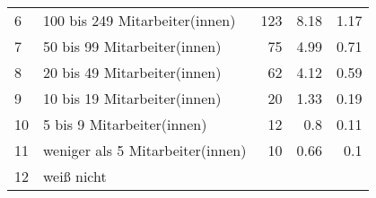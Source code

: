 \begin{longtable}{lXrrr}
     6 &
     \multicolumn{1}{X}{ 100 bis 249 Mitarbeiter(innen)   } &


       \num{123} &
       \num[round-mode=places,round-precision=2]{8.18} &
         \num[round-mode=places,round-precision=2]{1.17} \\

     7 &
     \multicolumn{1}{X}{ 50 bis 99 Mitarbeiter(innen)   } &


       \num{75} &
       \num[round-mode=places,round-precision=2]{4.99} &
         \num[round-mode=places,round-precision=2]{0.71} \\

     8 &
     \multicolumn{1}{X}{ 20 bis 49 Mitarbeiter(innen)   } &


       \num{62} &
       \num[round-mode=places,round-precision=2]{4.12} &
         \num[round-mode=places,round-precision=2]{0.59} \\

     9 &
     \multicolumn{1}{X}{ 10 bis 19 Mitarbeiter(innen)   } &


       \num{20} &
       \num[round-mode=places,round-precision=2]{1.33} &
         \num[round-mode=places,round-precision=2]{0.19} \\

     10 &
     \multicolumn{1}{X}{ 5 bis 9 Mitarbeiter(innen)   } &


       \num{12} &
       \num[round-mode=places,round-precision=2]{0.8} &
         \num[round-mode=places,round-precision=2]{0.11} \\

     11 &
     \multicolumn{1}{X}{ weniger als 5 Mitarbeiter(innen)   } &


       \num{10} &
       \num[round-mode=places,round-precision=2]{0.66} &
         \num[round-mode=places,round-precision=2]{0.1} \\

     12 &
     \multicolumn{1}{X}{ weiß nicht   } &



\end{longtable}
